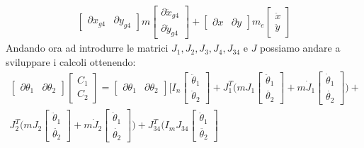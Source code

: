\begin{equation}
\begin{split}
\begin{bmatrix}
\partial x_{g4} & \partial y_{g4}
\end{bmatrix}m\begin{bmatrix}
\partial \ddot{x}_{g4} \\ \partial \ddot{y}_{g4} \end{bmatrix} + \begin{bmatrix}
\partial x & \partial y
\end{bmatrix}m_e \begin{bmatrix}
\ddot{x} \\ \ddot{y}
\end{bmatrix}
\end{split}
\label{eq:DinamicaGrande}
\end{equation}
Andando ora ad introdurre le matrici $J_1, J_2, J_3, J_4, J_{34}$ e $J$ possiamo andare a sviluppare i calcoli ottenendo:
\begin{equation*}
\begin{split}
\begin{bmatrix}
\partial \theta_1 & \partial \theta_2
\end{bmatrix}\begin{bmatrix}
C_1 \\ C_2
\end{bmatrix} =\begin{bmatrix}
\partial \theta_1 & \partial \theta_2
\end{bmatrix} \Bigg[ I_n\begin{bmatrix}
\ddot{\theta}_1 \\ \ddot{\theta}_2
\end{bmatrix}+ J_1^T \bigg( mJ_1\begin{bmatrix}
\ddot{\theta}_1 \\ \ddot{\theta_2}
\end{bmatrix}+m\dot{J}_1 \begin{bmatrix}
\dot{\theta}_1 \\\dot{\theta_2}
\end{bmatrix}\bigg) +
 \\J_2^T \bigg( mJ_2\begin{bmatrix}
\ddot{\theta}_1 \\ \ddot{\theta_2}
\end{bmatrix}+m\dot{J}_2 \begin{bmatrix}
\dot{\theta}_1 \\ \dot{\theta_2}
\end{bmatrix} \bigg)  +J_{34}^T \bigg( I_mJ_{34}\begin{bmatrix}
\ddot{\theta}_1 \\ \ddot{\theta_2}

\end{bmatrix}
\end{split}
\end{equation*}
